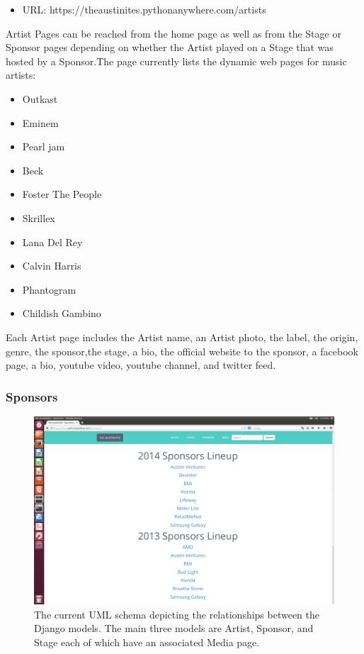 \documentclass[12pt,english]{scrartcl}
\begin{document}
\begin{itemize}
 \item URL: https://theaustinites.pythonanywhere.com/artists
\end{itemize}

Artist Pages can be reached from the home page as well as from the Stage or Sponsor pages depending on whether the Artist played on
a Stage that was hosted by a Sponsor.The page currently lists the dynamic web pages for music artists:
\begin{itemize}
 \item Outkast
 \item Eminem
 \item Pearl jam
 \item Beck
 \item Foster The People
 \item Skrillex
 \item Lana Del Rey
 \item Calvin Harris
 \item Phantogram
 \item Childish Gambino
\end{itemize}

Each Artist page includes the Artist name, an Artist photo, the label, the origin, genre, the sponsor,the stage, a bio,
the official website to the sponsor, a facebook page, a bio, youtube video, youtube channel, and twitter feed.

\subsubsection{Sponsors}
\begin{figure}[h!]
\includegraphics[width=\textwidth]{sponsors.png}
 \caption{The current UML schema depicting the relationships between the Django models. The main three models are Artist, Sponsor, and Stage each of which have an associated Media page.}
\end{figure}
\end{document}
